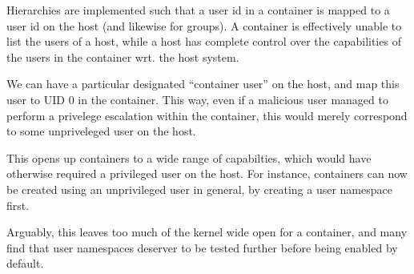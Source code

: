 Hierarchies are implemented such that a user id in a container is mapped to a
user id on the host (and likewise for groups). A container is effectively
unable to list the users of a host, while a host has complete control over the
capabilities of the users in the container wrt. the host system. 

We can have a particular designated ``container user'' on the host, and map
this user to UID 0 in the container. This way, even if a malicious user managed
to perform a privelege escalation within the container, this would merely
correspond to some unpriveleged user on the host.

This opens up containers to a wide range of capabilties, which would have
otherwise required a privileged user on the host. For instance, containers can
now be created using an unprivileged user in general, by creating a user
namespace first.

Arguably, this leaves too much of the kernel wide open for a container, and
many find that user namespaces deserver to be tested further before being
enabled by default\cite{kerrisk-2013, arch-linux-userns,fedora-userns}.
